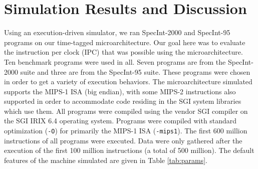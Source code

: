 \documentclass[10pt,dvips]{article}
\begin{document}
\section{Simulation Results and Discussion}
%
Using an execution-driven simulator, we ran
SpecInt-2000 and SpecInt-95 programs on our
time-tagged microarchitecture.  
Our goal here was to evaluate
the instruction per clock (IPC) that was possible using
the microarchitecture.
Ten benchmark programs were used
in all.  
Seven programs are from the SpecInt-2000 suite and
three are from the SpecInt-95 suite.  
These programs were
chosen in order to get a variety of execution behaviors.
The microarchitecture simulated supports 
the MIPS-1 ISA (big endian), with some MIPS-2
instructions also supported in order to accommodate code residing in
the SGI system libraries which use them.
All programs were compiled using the vendor SGI compiler on
the SGI IRIX 6.4 operating system.
Programs were compiled with
standard optimization ({\tt -O}) for primarily the MIPS-1 ISA ({\tt -mips1}).
The first 600 million instructions of all programs were
executed.  Data were only gathered after the execution of
the first 100 million instructions (a total of 500 million).
The default features of the machine simulated are
given in Table \ref{tab:params}.
%
\end{document}
